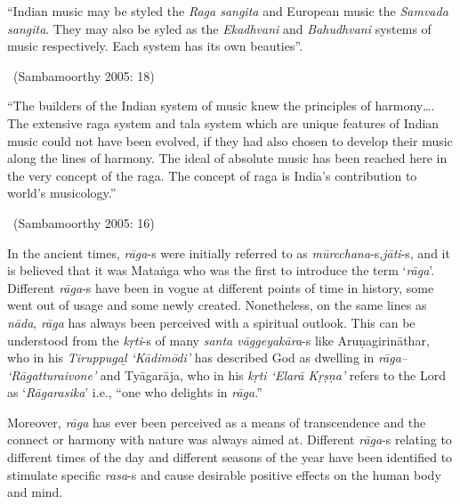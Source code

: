 \begin{myquote}
“Indian music may be styled the \textit{Raga sangita} and European music the \textit{Samvada sangita}. They may also be syled as the \textit{Ekadhvani} and \textit{Bahudhvani} systems of music respectively. Each system has its own beauties”. 

~\hfill (Sambamoorthy 2005: 18)
\end{myquote}

\begin{myquote}
“The builders of the Indian system of music knew the principles of harmony…. The extensive raga system and tala system which are unique features of Indian music could not have been evolved, if they had also chosen to develop their music along the lines of harmony. The ideal of absolute music has been reached here in the very concept of the raga. The concept of raga is India’s contribution to world’s musicology.” 

~\hfill (Sambamoorthy 2005: 16)
\end{myquote}

In the ancient times, \textit{rāga}-s were initially referred to as \textit{mūrcchana}-s,\break \textit{jāti}-s, and it is believed that it was Mataṅga who was the first to introduce the term ‘\textit{rāga}’. Different \textit{rāga}-s have been in vogue at different points of time in history, some went out of usage and some newly created. Nonetheless, on the same lines as \textit{nāda}, \textit{rāga} has always been perceived with a spiritual outlook. This can be understood from the \textit{kṛti}-s of many \textit{santa vāggeyakāra}-s like Aruṇagirināthar, who in his \textit{Tiruppugaḻ ‘Kādimōdi’} has described God as dwelling in \textit{rāga– ‘Rāgatturaivone’} and Tyāgarāja, who in his \textit{kṛti ‘Elarā Kṛṣṇa’} refers to the Lord as ‘\textit{Rāgarasika}’ i.e., ``one who delights in \textit{rāga}.”

Moreover, \textit{rāga} has ever been perceived as a means of transcendence and the connect or harmony with nature was always aimed at. Different \textit{rāga}-s relating to different times of the day and different seasons of the year have been identified to stimulate specific \textit{rasa}-s and cause desirable positive effects on the human body and mind.

